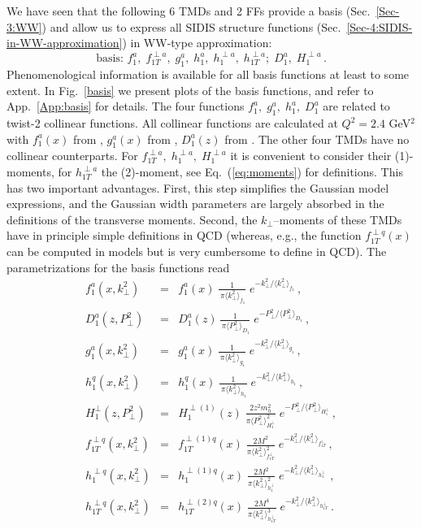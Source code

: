 \documentclass[a4paper,11pt]{article}
\newcommand{\blue}[1]{{\color{blue} #1}}
\newcommand{\be}{\begin{equation}}
\newcommand{\ee}{\end{equation}}
\newcommand{\ba}{\begin{eqnarray}}
\newcommand{\ea}{\end{eqnarray}}
\newcommand{\la}{\langle}
\newcommand{\ra}{\rangle}
\newcommand{\ps}[1]{\blue{#1}}
\def\kperp{k_\perp}
\def\pperp{P_\perp}
\def\avkperp{\la \kperp^2 \ra}
\def\avpperp{\la \pperp^2 \ra}
\begin{document}
We have seen that the following 6 TMDs and 2 FFs provide a basis
(Sec.~\ref{Sec-3:WW}) and allow us to express all SIDIS structure
functions (Sec.~\ref{Sec-4:SIDIS-in-WW-approximation})
in WW-type approximation:
\be\label{Eq:basis}
   \mbox{basis: \ \ }
   f_1^a, \; f_{1T}^{\perp a}, \; g_1^a, \; h_1^a, \;h_1^{\perp a},\; h_{1T}^{\perp a};
   \; D_1^a, \; H_1^{\perp a} \, .
\ee
Phenomenological information is available for all basis functions at
least to some extent.
In Fig.~\ref{basis} we present plots of the basis functions, and refer
to App.~\ref{App:basis} for details.
The four functions $f_1^a, \; g_1^a, \; h_1^a,\; D_1^a$  are related to
twist-2 collinear functions. All collinear functions are calculated at
$Q^2 = 2.4$ GeV$^2$ \ps{with} $f_1^a(x)$ from \cite{Martin:2009iq},
$g_1^a(x)$ from \cite{Gluck:1998xa}, $D_1^a(z)$ from
\cite{deFlorian:2007aj}. The other four TMDs
have no collinear counterparts.
For $f_{1T}^{\perp a},\;h_1^{\perp a},\;H_1^{\perp a}$ it is convenient to
consider their (1)-moments, for $ h_{1T}^{\perp a}$  the (2)-moment,
see Eq.~(\ref{eq:moments}) for definitions.
This has two important advantages. First, this step simplifies
the Gaussian model expressions, and the Gaussian width parameters are
largely absorbed in the definitions of the transverse moments. Second,
the $k_\perp$--moments of these TMDs have in principle simple definitions
in QCD (whereas, e.g., the function $f_{1T}^{\perp q}(x)$ can be computed in
models but is very cumbersome to define in QCD).
The parametrizations for the basis functions read
\begin{subequations}\ba
	f^a_1(x,\kperp^2) &=& f^a_1(x)\;
    	\frac{1}{\,\pi\avkperp_{f_1}}\;e^{-\kperp^2/\avkperp_{f_1}} \, ,
	\label{Eq:Gauss-f1}\\
    	D^a_1(z,\pperp^2) &=& D_1^a(z)\,
    	\frac{1}{\,\pi\avpperp_{D_1}}\;e^{-\pperp^2/\avpperp_{D_1}} \, ,
	\label{Eq:Gauss-D1}\\
	g^a_1(x,\kperp^2) &=& g^a_1(x)\;
    	\frac{1}{\,\pi\avkperp_{g_1}}\;e^{-\kperp^2/\avkperp_{g_1}} \, ,
	\label{Eq:Gauss-g1}\\
	h_{1}^{q} (x, \kperp^2) &=& h_{1}^{q} (x)\;
  	\frac{1}{\,\pi \avkperp_{h_1}}\;e^{-{\kperp^2}/{\avkperp_{h_1} }} \, ,
	\label{Eq:Gauss-h1}\\
	H_{1}^{\perp}(z,\pperp^2) &=&  H_{1}^{\perp (1)}(z) \;
	\frac{2 z^2 m_h^2}{\pi \avpperp_{H_{1}^\perp}^2} \;
	e^{-\pperp^2/{\avpperp_{H_{1}^\perp}}}\, ,\\
	f_{1T}^{\perp q}(x,\kperp^2) &=&  f_{1T}^{\perp (1) q}(x)   \;
	\frac{2 M^2}{\pi \avkperp_{f_{1T}^\perp}^2} \;
	e^{-\kperp^2/{\avkperp_{f_{1T}^\perp}}}
	\label{Eq:Gauss-f1Tperp}\, ,\\
	h_{1}^{\perp q}(x,\kperp^2) &=&  h_{1}^{\perp (1) q}(x)\;
   	\frac{2 M^2}{\pi \avkperp_{h_{1}^\perp}^2}\;
 	e^{-\kperp^2/{\avkperp_{h_{1}^\perp}}}\,
	\label{Eq:Gauss-h1perp}\, ,\\
	h_{1T}^{\perp q}(x,\kperp^2) &=&  h_{1T}^{\perp (2) q}(x)\;
   	\frac{2 M^4}{\pi \avkperp_{h_{1T}^\perp}^3} \;
	e^{-\kperp^2/{\avkperp_{h_{1T}^\perp}}}
	\label{Eq:Gauss-h1Tperp}\, .
\ea\end{subequations}
\end{document}
